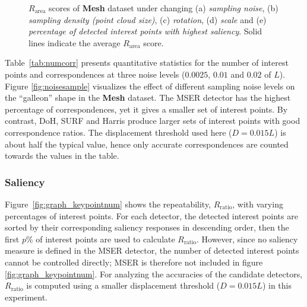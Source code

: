 \begin{figure}[ht]
{}
\caption{$R_{\textrm{area}}$ scores of \textbf{Mesh} dataset under changing (a) \emph{sampling noise}, (b) \emph{sampling density (point cloud size)}, (c) \emph{rotation}, (d) \emph{scale} and (e) \emph{percentage of detected interest points with highest saliency}. Solid lines indicate the average $R_{\textrm{area}}$ score.}
\label{fig:graph_graph0}
\end{figure}

Table~\ref{tab:numcorr} presents quantitative statistics for the number of interest points and correspondences at three noise levels ($0.0025$, $0.01$ and $0.02$ of $L$). Figure \ref{fig:noisesample} visualizes the effect of different sampling noise levels on the ``galleon'' shape in the \textbf{Mesh} dataset. The MSER detector has the highest percentage of correspondences, yet it gives a smaller set of interest points. By contrast, DoH, SURF and Harris produce larger sets of interest points with good correspondence ratios. The displacement threshold used here ($D = 0.015L$) is about half the typical value, hence only accurate correspondences are counted towards the values in the table. 

\subsubsection{Saliency}

Figure~\ref{fig:graph_keypointnum} shows the repeatability, $R_\textrm{ratio}$, with varying percentages of interest points. For each detector, the detected interest points are sorted by their corresponding saliency responses in descending order, then the first $p\%$ of interest points are used to calculate $R_\mathrm{ratio}$. However, since no saliency measure is defined in the MSER detector, the number of detected interest points cannot be controlled directly; MSER is therefore not included in figure \ref{fig:graph_keypointnum}. For analyzing the accuracies of the candidate detectors, $R_\textrm{ratio}$ is computed using a smaller displacement threshold ($D = 0.015L$) in this experiment.   

